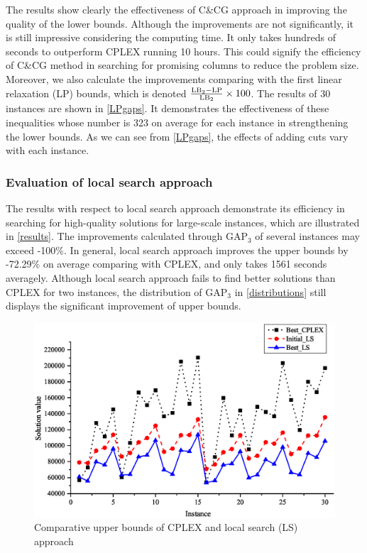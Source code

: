 \documentclass[11pt,nonblindrev,fleqn]{article}
\begin{document}
The results show clearly the effectiveness of C\&CG approach in improving the quality of the lower bounds. Although the improvements are not significantly, it is still impressive considering the computing time. It only takes hundreds of seconds to outperform CPLEX running 10 hours. This could signify the efficiency of C\&CG method in searching for promising columns to reduce the problem size. Moreover, we also calculate the improvements comparing with the first linear relaxation (LP) bounds, which is denoted $\rm \frac{LB_2 - LP}{LB_2}\times 100$. The results of 30 instances are shown in \autoref{LPgaps}. It demonstrates the effectiveness of these inequalities whose number is 323 on average for each instance in strengthening the lower bounds. As we can see from \autoref{LPgaps}, the effects of adding cuts vary with each instance.

\subsubsection{Evaluation of local search approach}
The results with respect to local search approach demonstrate its efficiency in searching for high-quality solutions for large-scale instances, which are illustrated in \autoref{results}. The improvements calculated through GAP$_3$ of several instances may exceed -100\%. In general, local search approach improves the upper bounds by -72.29\% on average comparing with CPLEX, and only takes 1561 seconds averagely. Although local search approach fails to find better solutions than CPLEX for two instances, the distribution of GAP$_3$ in \autoref{distributions} still displays the significant improvement of upper bounds.
\begin{figure}[H]
\setlength{\abovecaptionskip}{-5pt}
\setlength{\belowcaptionskip}{-5pt}
\centering
\includegraphics[width=0.8\linewidth]{F6.eps}
\caption{Comparative upper bounds of CPLEX and local search (LS) approach}
\label{threeUB}
\end{figure}
\end{document}
